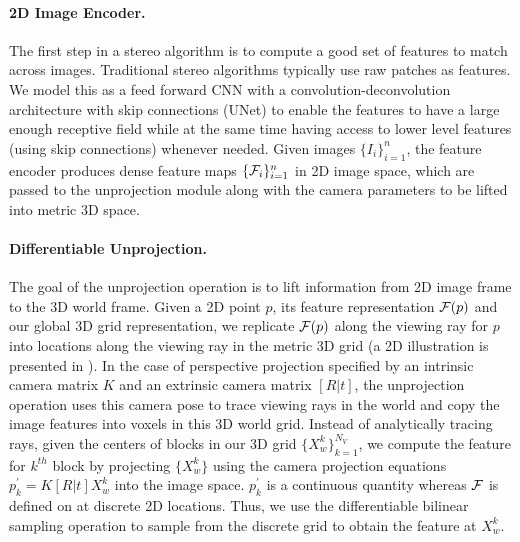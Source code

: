 \documentclass[../thesis.tex]{subfiles}
\begin{document}
\paragraph{2D Image Encoder.}
The first step in a stereo algorithm is to compute a good set of features to match across images. Traditional stereo algorithms typically use raw patches as features. We model this as a feed forward CNN with a convolution-deconvolution architecture with skip connections (UNet) \cite{unet_2015} to enable the features to have a large enough receptive field while at the same time having access to lower level features (using skip connections) whenever needed. Given images $\{I_i\}_{i=1}^n$, the feature encoder produces dense feature maps $\{\mathcal{F}_i\}_{i=1}^n$ in 2D image space, which are passed to the unprojection module along with the camera parameters to be lifted into metric 3D space.

\paragraph{Differentiable Unprojection.}
The goal of the unprojection operation is to lift information from 2D image frame to the  3D world frame. Given a 2D point $p$, its feature representation $\mathcal{F}(p)$ and our global 3D grid representation, we replicate $\mathcal{F}(p)$ along the viewing ray for $p$ into locations along the viewing ray in the metric 3D grid (a 2D illustration is presented in ). In the case of perspective projection specified by an intrinsic camera matrix $K$ and an extrinsic camera matrix $[R|t]$, the unprojection operation uses this camera pose to trace viewing rays in the world and copy the image features into voxels in this 3D world grid. Instead of analytically tracing rays, given the centers of blocks in our 3D grid $\{X_w^k\}_{k=1}^{N_V}$, we compute the feature for $k^{th}$ block by projecting $\{X_w^k\}$ using the camera projection equations $p_k^\prime=K[R|t]X_{w}^k$ into the image space. $p_k^\prime$ is a continuous quantity whereas $\mathcal{F}$ is defined on at discrete 2D locations. Thus, we use the differentiable bilinear sampling operation to sample from the discrete grid \cite{spatialtrans_nips2015} to obtain the feature at $X_{w}^k$. 
\end{document}
